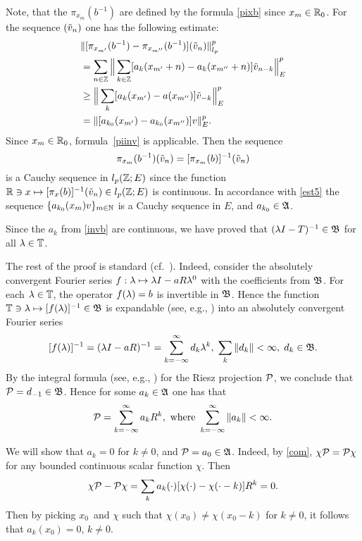 \begin{pf}
Note, that the $\pi_{x_m} (b^{-1})$ are defined
by the formula \eqref{pixb} since $x_m\in{\Bbb{R}}_0$.  For the
sequence $(\tilde v_n)$ one has the following estimate:
\begin{align} \label{est5}
& \| [\pi_{x_{m'}} (b^{-1}) -\pi_{x_{m''}} (b^{-1})] (\tilde v_n)
\|_{l_p}^p  \nonumber \\
&=\sum_{n\in{\Bbb{Z}}} \Big\|\sum_{k\in{\Bbb{Z}}} [a_k (x_{m'} +n) -a_k (x_{m''}+n)
]\tilde v_{n-k} \Big\|_E^p \nonumber \\
& \geq \Big\| \sum_k [a_k (x_{m'}) -a(x_{m''})] \tilde
v_{-k} \Big\|_E^p \nonumber \\
&= \| [a_{k_0} (x_{m'}) -a_{k_0} (x_{m''})] v\|_E^p.
\end{align}
Since $x_m \in{\Bbb{R}}_0$, formula~\eqref{piinv} is applicable.
Then the sequence
$$\pi_{x_m} (b^{-1}) (\tilde v_n) =[\pi_{x_m} (b) ]^{-1} (\tilde v_n)$$ is a
Cauchy sequence in $l_p ({\Bbb{Z}};E)$ since the function
${\Bbb{R}}\ni x \mapsto [\pi_x (b)
]^{-1}(\tilde v_n) \in l_p ({\Bbb{Z}};E)$ is continuous. In accordance with
\eqref{est5} the sequence  $\{a_{k_0} (x_m) v\}_{m\in{\Bbb{N}}}$ is a
Cauchy sequence in $E$, and $a_{k_0}\in{\frak{A}}$.

Since the $a_k$ from \eqref{invb} are continuous,
we have proved that $(\lambda I -T)^{-1} \in
{\frak{B}}$ for all $\lambda \in {\Bbb{T}}$.

The rest of the proof is standard
(cf.~\cite{2,18,27}).  Indeed, consider the absolutely convergent
Fourier series $f:\lambda \mapsto \lambda I -aR\lambda ^0$ with the
coefficients from
${\frak{B}}$.  For each $\lambda \in{\Bbb{T}}$, the operator
$f(\lambda) =b$ is invertible in
${\frak{B}}$.  Hence the function ${\Bbb{T}} \ni \lambda \mapsto [f(\lambda)]^{-1}
\in{\frak{B}}$ is expandable (see, e.g., \cite{5}) into an absolutely
convergent Fourier series
$$
[f(\lambda)]^{-1} =(\lambda I -aR)^{-1} =\sum_{k=-\infty}^\infty d_k \lambda^k,\;
\sum_k \|d_k\| < \infty, \; d_k \in{\frak{B}}.
$$
By the integral formula (see, e.g., \cite[p.~20]{9}) for
the Riesz projection ${\cal{P}}$, we conclude that
${\cal{P}} =d_{-1}\in{\frak{B}}$.  Hence for some $a_k \in{\frak{A}}$ one has that
$${\cal{P}}=\sum_{k=-\infty}^{\infty} a_k R^k, \mbox { where }
\sum_{k=-\infty}^{\infty} \|a_k\|  <\infty.
$$

We will show that $a_k =0$ for $k\neq 0$, and ${\cal{P}}
=a_0 \in {\frak{A}}$.  Indeed, by \eqref{com}, $\chi {\cal{P}} ={\cal{P}} \chi$ for
any bounded continuous scalar function $\chi$.  Then
$$
\chi{\cal{P}} -{\cal{P}} \chi =\sum_k a_k (\cdot ) [\chi (\cdot ) -\chi (\cdot
-k)] R^k =0.
$$
Then by picking $x_0$\ and $\chi$ such that $\chi (x_0) \neq \chi
(x_0 -k)$ for $k\ne0$, it follows that $a_k (x_0) =0$, $k\neq 0$.
\end{pf}

